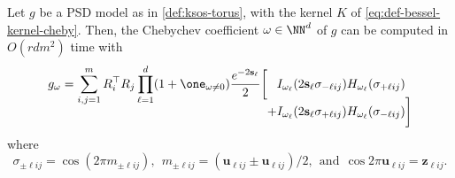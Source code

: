 \documentclass{article}
\begin{document}
\begin{lemma}\label{lem:cheby-coeff-bessel}
  Let $g$ be a PSD model as in \cref{def:ksos-torus}, with the kernel $K$ of \cref{eq:def-bessel-kernel-cheby}. Then, the Chebychev coefficient $\omega \in \NN^d$ of $g$ can be computed in $O(r d m^2)$ time with
  \begin{equation}
    g_{\omega} = \sum_{i, j = 1}^m R_i^\top R_j \prod_{\ell = 1}^{d} (1 + \one_{\omega \neq 0}) \frac{e^{-2\mathbf{s}_\ell}}{2} \bigg[
    \begin{aligned}[t]
        & I_{\omega_\ell}(2\mathbf{s}_\ell \sigma_{- \ell i j}) H_{\omega_\ell}(\sigma_{+ \ell i j}) \\
      + & I_{\omega_\ell}(2\mathbf{s}_\ell \sigma_{+ \ell i j}) H_{\omega_\ell}(\sigma_{- \ell i j})
      \bigg]
    \end{aligned}
  \end{equation}
  where
  \begin{equation*}
    \sigma_{\pm \ell i j} = \cos(2\pi m_{\pm \ell i j}),
    ~~
    m_{\pm \ell i j} = (\mathbf{u}_{\ell i j} \pm \mathbf{u}_{\ell i j})/2,
    ~~ \text{and} ~~ \cos 2 \pi \mathbf{u}_{\ell i j} = \mathbf{z}_{\ell i j}.
  \end{equation*}
\end{lemma}
\end{document}
